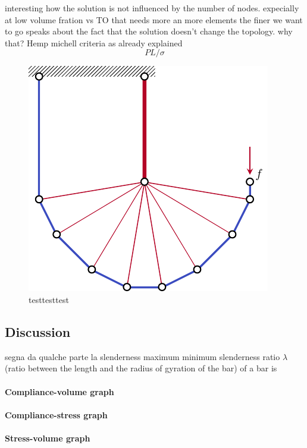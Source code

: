 interesting how the solution is not influenced by the number of nodes. expecially at low volume fration vs TO that needs more an more elements the finer we want to go
speaks about the fact that the solution doesn't change the topology. why that? Hemp michell criteria as already explained 
\begin{equation}
    PL/\sigma
\end{equation}
\begin{figure}[]
    \centering
    \includegraphics[]{figures/03_comparison_TO_TTO/05_tto_sol/L_tto_opt.pdf}
    \caption{testtesttest}
    \label{fig:03_L_tto}
\end{figure}
\subsection{Discussion}
segna da qualche parte la slenderness maximum
minimum slenderness ratio $\lambda$ (ratio between the length and the radius of gyration of the bar) of a bar is

\paragraph{Compliance-volume graph}

\paragraph{Compliance-stress graph}

\paragraph{Stress-volume graph}

